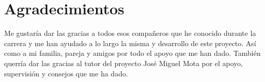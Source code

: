 \section*{Agradecimientos}

Me gustaría dar las gracias a todos esos compañeros que he conocido durante la carrera y me han
ayudado a lo largo la misma y desarrollo de este proyecto. Así como a mi familia, pareja y amigos por
todo el apoyo que me han dado. También querría dar las gracias al tutor del proyecto José Miguel Mota
por el apoyo, supervisión y consejos que me ha dado.
